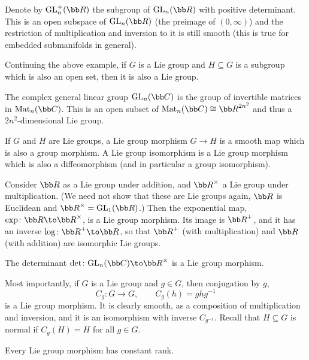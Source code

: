     Denote by $\gl_n^+(\bR)$ the subgroup of $\gl_n(\bR)$ with positive determinant.
    This is an open subspace of $\gl_n(\bR)$ (the preimage of $(0,\infty)$) and the restriction of multiplication and inversion to it
    is still smooth (this is true for embedded submanifolds in general).

\eexam

Continuing the above example, if $G$ is a Lie group and $H\subseteq G$ is a subgroup which is also an open set, then it is also a Lie group.

\bexam

    The complex general linear group $\gl_n(\bC)$ is the group of invertible matrices in $\mat_n(\bC)$.
    This is an open subset of $\mat_n(\bC)\cong\bR^{2n^2}$ and thus a $2n^2$-dimensional Lie group.

\eexam

\bdefn

    If $G$ and $H$ are Lie groups, a {\emphcolor Lie group morphism} $G\to H$ is a smooth map which is also a group morphism.
    A {\emphcolor Lie group isomorphism} is a Lie group morphism which is also a diffeomorphism (and in particular a group isomorphism).

\edefn

\bexam

    Consider $\bR$ as a Lie group under addition, and $\bR^\times$ a Lie group under multiplication.
    (We need not show that these are Lie groups again, $\bR$ is Euclidean and $\bR^\times=\gl_1(\bR)$.)
    Then the exponential map, $\exp\colon\bR\to\bR^\times$, is a Lie group morphism.
    Its image is $\bR^+$, and it has an inverse $\log\colon\bR^+\to\bR$, so that $\bR^+$ (with multiplication) and $\bR$ (with addition)
    are isomorphic Lie groups.

\eexam

\bexam

    The determinant $\det\colon\gl_n(\bC)\to\bR^\times$ is a Lie group morphism.

\eexam

Most importantly, if $G$ is a Lie group and $g\in G$, then {\emphcolor conjugation} by $g$,
$$ C_g\colon G\to G,\qquad C_g(h) = ghg^{-1} $$
is a Lie group morphism.
It is clearly smooth, as a composition of multiplication and inversion, and it is an isomorphism with inverse $C_{g^{-1}}$.
Recall that $H\subseteq G$ is {\emphcolor normal} if $C_g(H)=H$ for all $g\in G$.

\bthrm

    Every Lie group morphism has constant rank.

